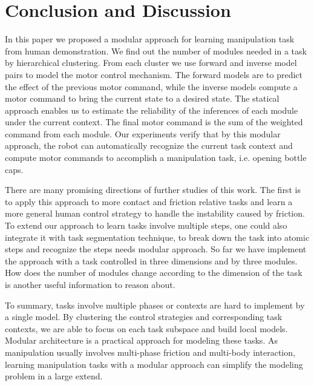 \documentclass[preprint,12pt]{elsarticle}
\begin{document}
\section{Conclusion and Discussion}
\label{sec:diss}
In this paper we proposed a modular approach for learning manipulation task from human demonstration. We find out the number of modules needed in a task by hierarchical clustering. From each cluster we use forward and inverse model pairs to model the motor control mechanism. The forward models are to predict the effect of the previous motor command, while the inverse models compute a motor command to bring the current state to a desired state. The statical approach enables us to estimate the reliability of the inferences of each module under the current context. The final motor command is the sum of the weighted command from each module. Our experiments verify that by this modular approach, the robot can automatically recognize the current task context and compute motor commands to accomplish a manipulation task, i.e. opening bottle caps.


There are many promising directions of further studies of this work. The first is to apply this approach to more contact and friction relative tasks and learn a more general human control strategy to handle the instability caused by friction. To extend our approach to learn tasks involve multiple steps, one could also integrate it with task segmentation technique, to break down the task into atomic steps and recognize the steps needs modular approach. So far we have implement the approach with a task controlled in three dimensions and by three modules. How does the number of modules change according to the dimension of the task is another useful information to reason about.

To summary, tasks involve multiple phases or contexts are hard to implement by a single model. By clustering the control strategies and corresponding task contexts, we are able to focus on each task subspace and build local models. Modular architecture is a practical approach for modeling these tasks. As manipulation usually involves multi-phase friction and multi-body interaction, learning manipulation tasks with a modular approach can simplify the modeling problem in a large extend.
\end{document}
